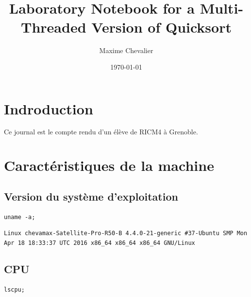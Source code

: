\documentclass[11pt]{article}
\author{Maxime Chevalier}
\date{\today}
\title{Laboratory Notebook for a Multi-Threaded Version of Quicksort}
\begin{document}
\maketitle
\tableofcontents


\section{Indroduction}
\label{sec:orgheadline1}
Ce journal est le compte rendu d'un élève de RICM4 à Grenoble.
\section{Caractéristiques de la machine}
\label{sec:orgheadline5}
\subsection{Version du système d'exploitation}
\label{sec:orgheadline2}
\begin{verbatim}
uname -a;
\end{verbatim}

\begin{verbatim}
Linux chevamax-Satellite-Pro-R50-B 4.4.0-21-generic #37-Ubuntu SMP Mon Apr 18 18:33:37 UTC 2016 x86_64 x86_64 x86_64 GNU/Linux
\end{verbatim}

\subsection{CPU}
\label{sec:orgheadline3}
\begin{verbatim}
lscpu;
\end{verbatim}
\end{document}
